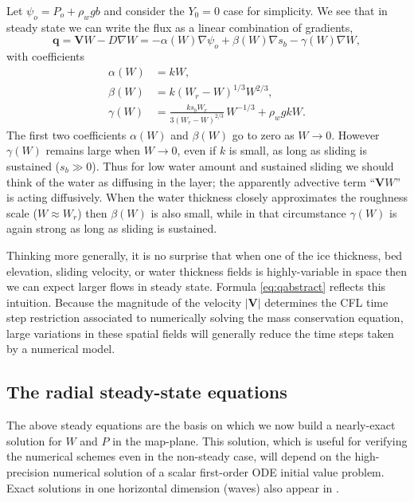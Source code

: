\documentclass[11pt,final]{amsart}
\newcommand\bV{\mathbf{V}}
\newcommand\bq{\mathbf{q}}
\newcommand{\grad}{\nabla}
\begin{document}
Let $\psi_o = P_o + \rho_w g b$ and consider the $Y_0=0$ case for simplicity.  We see that in steady state we can write the flux as a linear combination of gradients,
\begin{equation}
\bq = \bV W - D \grad W = - \alpha(W) \grad \psi_o + \beta(W) \grad s_b - \gamma(W) \grad W,  \label{eq:qabstract}
\end{equation}
with coefficients
\begin{align*}
\alpha(W) &= k W, \\
\beta(W)  &= k \left(W_r - W\right)^{1/3} W^{2/3}, \\
\gamma(W) &= \frac{k s_b W_r}{3 (W_r - W)^{2/3}}\, W^{-1/3} + \rho_w g k W.
\end{align*}
The first two coefficients $\alpha(W)$ and $\beta(W)$ go to zero as $W\to 0$.  However $\gamma(W)$ remains large when $W\to 0$, even if $k$ is small, as long as sliding is sustained ($s_b \gg 0$).  Thus for low water amount and sustained sliding we should think of the water as diffusing in the layer; the apparently advective term ``$\bV W$'' is acting diffusively.  When the water thickness closely approximates the roughness scale ($W\approx W_r$) then $\beta(W)$ is also small, while in that circumstance $\gamma(W)$ is again strong as long as sliding is sustained.

Thinking more generally, it is no surprise that when one of the ice thickness, bed elevation, sliding velocity, or water thickness fields is highly-variable in space then we can expect larger flows in steady state.  Formula \eqref{eq:qabstract} reflects this intuition.  Because the magnitude of the velocity $|\bV|$ determines the CFL time step restriction \citep{MortonMayers} associated to numerically solving the mass conservation equation, large variations in these spatial fields will generally reduce the time steps taken by a numerical model.

\subsection*{The radial steady-state equations}  The above steady equations are the basis on which we now build a nearly-exact solution for $W$ and $P$ in the map-plane.  This solution, which is useful for verifying the numerical schemes even in the non-steady case, will depend on the high-precision numerical solution of a scalar first-order ODE initial value problem.  Exact solutions in one horizontal dimension (waves) also appear in \cite{Schoofetal2012}.
\end{document}
